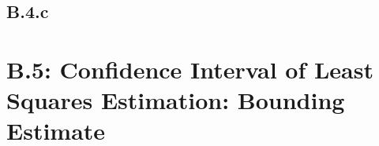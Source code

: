 \documentclass[]{article}
\begin{document}
    \subsection*{B.4.c}
    
\section*{B.5: Confidence Interval of Least Squares Estimation: Bounding Estimate}
\end{document}
